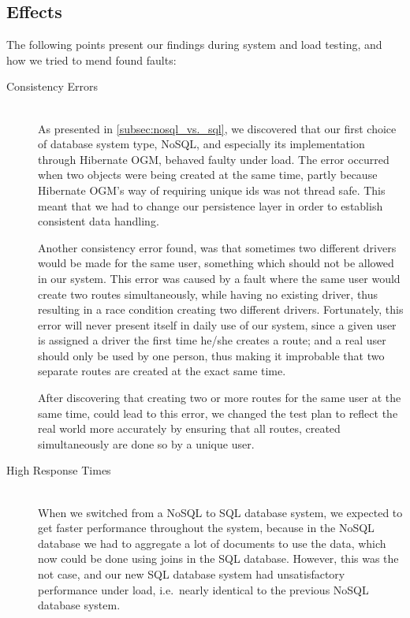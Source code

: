 \subsection{Effects}\label{subsec:testeffects}
The following points present our findings during system and load testing, and how we tried to mend found faults:
\begin{description}
    \item[Consistency Errors]\hfill \\
        As presented in \cref{subsec:nosql_vs._sql}, we discovered that our first choice of database system type, NoSQL, and especially its implementation through Hibernate OGM, behaved faulty under load.
        The error occurred when two objects were being created at the same time, partly because Hibernate OGM's way of requiring unique ids was not thread safe.
        This meant that we had to change our persistence layer in order to establish consistent data handling.

        Another consistency error found, was that sometimes two different drivers would be made for the same user, something which should not be allowed in our system.
        This error was caused by a fault where the same user would create two routes simultaneously, while having no existing driver, thus resulting in a race condition creating two different drivers.
        Fortunately, this error will never present itself in daily use of our system, since a given user is assigned a driver the first time he/she creates a route;
        and a real user should only be used by one person, thus making it improbable that two separate routes are created at the exact same time.

        After discovering that creating two or more routes for the same user at the same time, could lead to this error, we changed the test plan to reflect the real world more accurately by ensuring that all routes, created simultaneously are done so by a unique user.
    \item[High Response Times]\hfill \\
        When we switched from a NoSQL to SQL database system, we expected to get faster performance throughout the system, because in the NoSQL database we had to aggregate a lot of documents to use the data, which now could be done using joins in the SQL database.
        However, this was the not case, and our new SQL database system had unsatisfactory performance under load, i.e.~nearly identical to the previous NoSQL database system.


\end{description}
